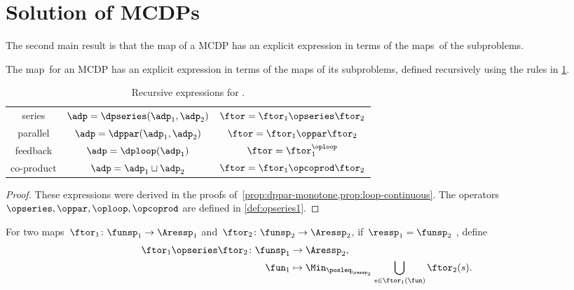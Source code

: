

\section{Solution of MCDPs}
\label{sec:Solution-of-Monotone}

The second main result is that the map \ftor of a MCDP has an explicit expression in terms of the maps~\ftor of the subproblems.


\begin{theorem}
    \label{thm:CDP-solvig}
    The map~\ftor for an MCDP has an explicit expression in terms of the maps \ftor of its subproblems, defined recursively using the rules in \cref{tab:correspondence}.
\end{theorem}

\begin{table}[h]
    \caption{Recursive expressions for \ftor.}
    \label{tab:correspondence}
    \centering{}\setlength\extrarowheight{5pt}\normalsize
    \begin{tabular}{ccc}
        series & $\adp=\dpseries(\adp_{1},\adp_{2})$ & $\ftor=\ftor_{1}\opseries\ftor_{2}$\tabularnewline
        parallel & $\adp=\dppar(\adp_{1},\adp_{2})$ & $\ftor=\ftor_{1}\oppar\ftor_{2}$\tabularnewline
        feedback & $\adp=\dploop(\adp_{1})$ & $\ftor=\ftor_{1}^{\oploop}$\tabularnewline
        co-product & $\adp=\adp_{1}\sqcup\adp_{2}$ & $\ftor=\ftor_{1}\opcoprod\ftor_{2}$\tabularnewline
    \end{tabular}
\end{table}

\begin{proof}
    These expressions were derived in the proofs of~\cref{prop:dppar-monotone,prop:loop-continuous}.
    The operators $\opseries,\oppar,\oploop,\opcoprod$ are defined in \cref{def:opseries1}.
\end{proof}
\begin{definition}
    \label{def:opseries1}
    For two maps~$\ftor_{1}\colon\funsp_{1}\rightarrow\Aressp_{1}$
    and~$\ftor_{2}\colon\funsp_{2}\rightarrow\Aressp_{2}$, if~$\ressp_{1}=\funsp_{2}$
    , define
    \begin{align*}
    {\displaystyle \ftor_{1}\opseries\ftor_{2}\colon\funsp_{1}}
        & \rightarrow\Aressp_{2},\\
        \fun_{1} & \mapsto\Min_{\posleq_{\ressp_{2}}}\bigcup_{s\in\ftor_{1}(\fun)}\ftor_{2}(s).
    \end{align*}
\end{definition}

